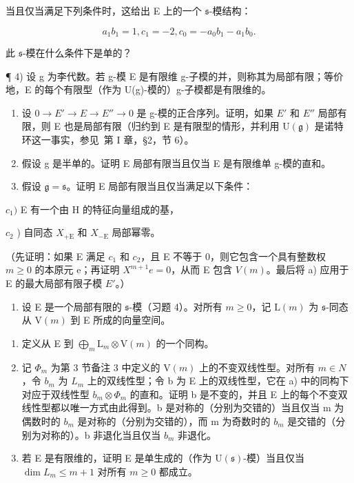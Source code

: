 当且仅当满足下列条件时，这给出 E 上的一个 \(\mathfrak{s}\)-模结构：

\[
a _ {1} b _ {1} = 1, c _ {1} = - 2, c _ {0} = - a _ {0} b _ {1} - a _ {1} b _ {0}.
\]

此 \(\mathfrak{s}\)-模在什么条件下是单的？

¶ 4) 设 g 为李代数。若 g-模 E 是有限维 g-子模的并，则称其为局部有限；等价地，E 的每个有限型（作为 U(g)-模的）g-子模都是有限维的。

\begin{enumerate}
\def\labelenumi{\alph{enumi})}
\item
  设 \(0 \rightarrow E' \rightarrow E \rightarrow E'' \rightarrow 0\) 是 g-模的正合序列。证明，如果 \(E'\) 和 \(E''\) 局部有限，则 E 也是局部有限（归约到 E 是有限型的情形，并利用 \(\mathrm{U}(\mathfrak{g})\) 是诺特环这一事实，参见~第 I 章，§2，节 6）。
\item
  假设 g 是半单的。证明 E 局部有限当且仅当 E 是有限维单 g-模的直和。
\item
  假设 \(\mathfrak{g} = \mathfrak{s}\)。证明 E 局部有限当且仅当满足以下条件：
\end{enumerate}

\(c_{1})\) E 有一个由 H 的特征向量组成的基，

\(c_{2}\) ) 自同态 \(X_{+\mathrm{E}}\) 和 \(X_{-\mathrm{E}}\) 局部幂零。

（先证明：如果 E 满足 \(c_{1}\) 和 \(c_{2}\)，且 E 不等于 0，则它包含一个具有整数权 \(m \geq 0\) 的本原元 e；再证明 \(X^{m+1}e = 0\)，从而 E 包含 \(V(m)\)。最后将 a) 应用于 E 的最大局部有限子模 \(E'\)。）

\begin{enumerate}
\def\labelenumi{\arabic{enumi})}
\setcounter{enumi}{4}
\tightlist
\item
  设 E 是一个局部有限的 \(\mathfrak{s}\)-模（习题 4）。对所有 \(m \geq 0\)，记 \(\mathrm{L}(m)\) 为 \(\mathfrak{s}\)-同态从 \(\mathrm{V}(m)\) 到 E 所成的向量空间。
\end{enumerate}

\begin{enumerate}
\def\labelenumi{\alph{enumi})}
\item
  定义从 E 到 \(\bigoplus_{m} \mathrm{L}_{m} \otimes \mathrm{V}(m)\) 的一个同构。
\item
  记 \(\Phi_{m}\) 为第 3 节备注 3 中定义的 \(\mathrm{V}(m)\) 上的不变双线性型。对所有 \(m \in N\)，令 \(b_{m}\) 为 \(L_{m}\) 上的双线性型；令 b 为 E 上的双线性型，它在 a) 中的同构下对应于双线性型 \(b_{m} \otimes \Phi_{m}\) 的直和。证明 b 是不变的，并且 E 上的每个不变双线性型都以唯一方式由此得到。b 是对称的（分别为交错的）当且仅当 m 为偶数时的 \(b_{m}\) 是对称的（分别为交错的），而 m 为奇数时的 \(b_{m}\) 是交错的（分别为对称的）。b 非退化当且仅当 \(b_{m}\) 非退化。
\item
  若 E 是有限维的，证明 E 是单生成的（作为 \(\mathrm{U}(\mathfrak{s})\)-模）当且仅当 \(\dim L_{m} \leq m + 1\) 对所有 \(m \geq 0\) 都成立。
\end{enumerate}

